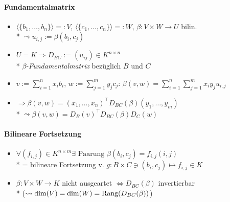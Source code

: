\paragraph{Fundamentalmatrix}
\begin{itemize}
	\item \( \langle \{ b_1, \dots, b_n \} \rangle =: V \), \( \langle \{ c_1, \dots, c_n \} \rangle =: W \), \( \beta: V \times W \to U \) bilin.
		\\*
		\( \leadsto u_{i,j} := \beta(b_i, c_j) \)
	\item \( U = K \Rightarrow D_{BC} := (u_{ij}) \in K^{n \times n} \) \\* \( \beta \)-\emph{Fundamentalmatrix} bezüglich \( B \) und \( C \)
	\item \( v := \sum_{i=1}^nx_ib_i \), \( w := \sum_{j=1}^my_jc_j \): \( \beta(v,w) = \sum_{i=1}^n\sum_{j=1}^mx_iy_ju_{i,j} \)
	\item \( \Rightarrow \beta(v,w) = (x_1, \dots, x_n)^\top D_{BC}(\beta)(y_1, \dots, y_m) \) 
		\\*
		\( \leadsto \beta(v,w)=D_B(v)^\top D_{BC}(\beta)D_C(w) \) 
\end{itemize}

\paragraph{Bilineare Fortsetzung}
\begin{itemize}
	\item \( \forall (f_{i,j}) \in K^{n \times m} \exists \text{ Paarung } \beta(b_i, c_j) = f_{i,j}(i,j) \)
		\\*
		= bilineare Fortsetzung v. \( g: B \times C \ni (b_i,c_j) \mapsto f_{i,j} \in K \)

	\item \( \beta: V \times W \to K \) nicht ausgeartet \( \Leftrightarrow D_{BC}(\beta) \) invertierbar \\*  (\( \leadsto \dim(V) = \dim(W) = \text{Rang}(D_{BC}(\beta)) \))
\end{itemize}